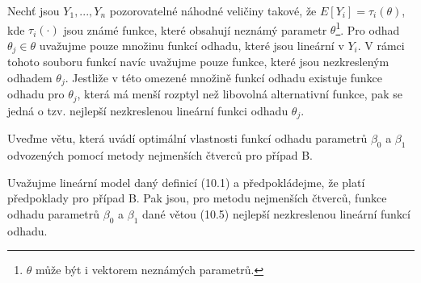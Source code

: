 \begin{definition}
Nechť jsou $Y_1, ..., Y_n$ pozorovatelné náhodné veličiny takové, že $E[Y_i] = \tau_i(\theta)$, kde $\tau_i(\cdot)$ jsou známé funkce, které obsahují neznámý parametr $\theta$\footnote{$\theta$ může být i vektorem neznámých parametrů.}. Pro odhad $\theta_j \in \theta$ uvažujme pouze množinu funkcí odhadu, které jsou lineární v $Y_i$. V rámci tohoto souboru funkcí navíc uvažujme pouze funkce, které jsou nezkresleným odhadem $\theta_j$. Jestliže v této omezené množině funkcí odhadu existuje funkce odhadu pro $\theta_j$, která má menší rozptyl než libovolná alternativní funkce, pak se jedná o tzv. nejlepší nezkreslenou lineární funkci odhadu $\theta_j$.
\end{definition}

Uveďme větu, která uvádí optimální vlastnosti funkcí odhadu parametrů $\beta_0$ a $\beta_1$ odvozených pomocí metody nejmenších čtverců pro případ B.

\begin{theorem}
Uvažujme lineární model daný definicí (10.1) a předpokládejme, že platí předpoklady pro případ B. Pak jsou, pro metodu nejmenších čtverců, funkce odhadu parametrů $\beta_0$ a $\beta_1$ dané větou (10.5) nejlepší nezkreslenou lineární funkcí odhadu. 
\end{theorem}

